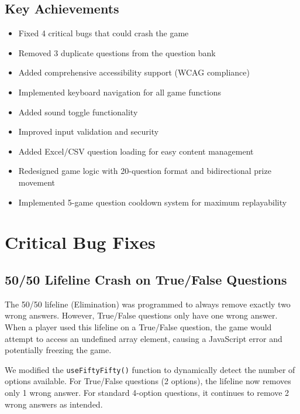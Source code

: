 \documentclass[11pt,a4paper]{article}
\begin{document}
\subsection{Key Achievements}
\begin{itemize}
    \item Fixed 4 critical bugs that could crash the game
    \item Removed 3 duplicate questions from the question bank
    \item Added comprehensive accessibility support (WCAG compliance)
    \item Implemented keyboard navigation for all game functions
    \item Added sound toggle functionality
    \item Improved input validation and security
    \item Added Excel/CSV question loading for easy content management
    \item Redesigned game logic with 20-question format and bidirectional prize movement
    \item Implemented 5-game question cooldown system for maximum replayability
\end{itemize}

\section{Critical Bug Fixes}

\subsection{50/50 Lifeline Crash on True/False Questions}

\begin{issuebox}
The 50/50 lifeline (Elimination) was programmed to always remove exactly two wrong answers. However, True/False questions only have one wrong answer. When a player used this lifeline on a True/False question, the game would attempt to access an undefined array element, causing a JavaScript error and potentially freezing the game.
\end{issuebox}

\begin{fixbox}
We modified the \texttt{useFiftyFifty()} function to dynamically detect the number of options available. For True/False questions (2 options), the lifeline now removes only 1 wrong answer. For standard 4-option questions, it continues to remove 2 wrong answers as intended.
\end{fixbox}
\end{document}

